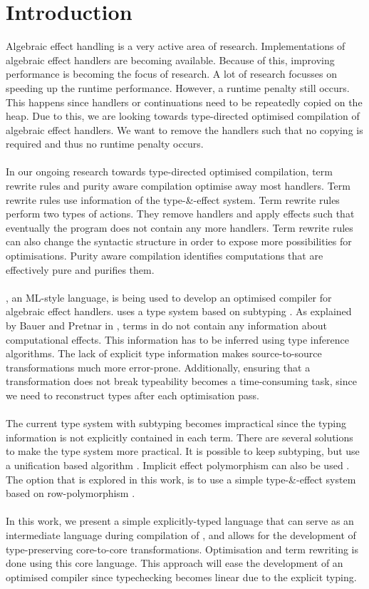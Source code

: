 \documentclass[sigplan,10pt]{acmart}\settopmatter{printfolios=true}
\begin{document}
\section{Introduction}
\label{intro}
Algebraic effect handling is a very active area of research. Implementations of algebraic effect handlers are becoming available. Because of this, improving performance is becoming the focus of research. A lot of research focusses on speeding up the runtime performance. However, a runtime penalty still occurs. This happens since handlers or continuations need to be repeatedly copied on the heap. Due to this, we are looking towards type-directed optimised compilation of algebraic effect handlers. We want to remove the handlers such that no copying is required and thus no runtime penalty occurs. \\
\\
In our ongoing research towards type-directed optimised compilation, term rewrite rules and purity aware compilation optimise away most handlers. Term rewrite rules use information of the type-\&-effect system. Term rewrite rules perform two types of actions. They remove handlers and apply effects such that eventually the program does not contain any more handlers. Term rewrite rules can also change the syntactic structure in order to expose more possibilities for optimisations. Purity aware compilation identifies computations that are effectively pure and purifies them.  \\
\\
\eff, an ML-style language, is being used to develop an optimised compiler for algebraic effect handlers. \eff uses a type system based on subtyping \cite{effectsystem}. As explained by Bauer and Pretnar in \cite{programming}, terms in \eff do not contain any information about computational effects. This information has to be inferred using type inference algorithms. The lack of explicit type information makes source-to-source transformations much more error-prone. Additionally, ensuring that a transformation does not break typeability becomes a time-consuming task, since we need to reconstruct types after each optimisation pass. \\
\\
The current type system with subtyping becomes impractical since the typing information is not explicitly contained in each term. There are several solutions to make the type system more practical. It is possible to keep subtyping, but use a unification based algorithm \cite{mlsub}. Implicit effect polymorphism can also be used \cite{impliciteff}. The option that is explored in this work, is to use a simple type-\&-effect system based on row-polymorphism \cite{type-directed, leijen2014koka, row}. \\
\\
In this work, we present a simple explicitly-typed language that can serve as an intermediate language during compilation of \eff, and allows for the development of type-preserving core-to-core transformations. Optimisation and term rewriting is done using this core language. This approach will ease the development of an optimised compiler since typechecking becomes linear due to the explicit typing.
\end{document}
